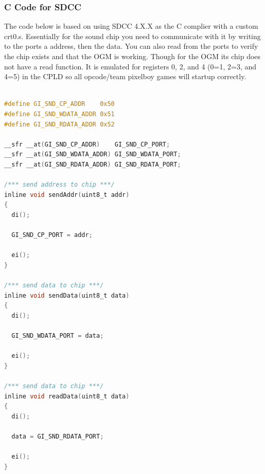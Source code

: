 \subsubsection{C Code for SDCC}

\par
The code below is based on using SDCC 4.X.X as the C complier with a custom crt0.s. Essentially for the sound chip you
need to communicate with it by writing to the ports a address, then the data. You can also read from the ports to
verify the chip exists and that the OGM is working. Though for the OGM its chip does not have a read function. It is
emulated for registers 0, 2, and 4 (0=1, 2=3, and 4=5) in the CPLD so all opcode/team pixelboy games will startup correctly.

\begin{lstlisting}[language=C]

#define GI_SND_CP_ADDR    0x50
#define GI_SND_WDATA_ADDR 0x51
#define GI_SND_RDATA_ADDR 0x52

__sfr __at(GI_SND_CP_ADDR)    GI_SND_CP_PORT;
__sfr __at(GI_SND_WDATA_ADDR) GI_SND_WDATA_PORT;
__sfr __at(GI_SND_RDATA_ADDR) GI_SND_RDATA_PORT;

/*** send address to chip ***/
inline void sendAddr(uint8_t addr)
{
  di();

  GI_SND_CP_PORT = addr;

  ei();
}

/*** send data to chip ***/
inline void sendData(uint8_t data)
{
  di();

  GI_SND_WDATA_PORT = data;

  ei();
}

/*** send data to chip ***/
inline void readData(uint8_t data)
{
  di();

  data = GI_SND_RDATA_PORT;

  ei();
}
\end{lstlisting}
